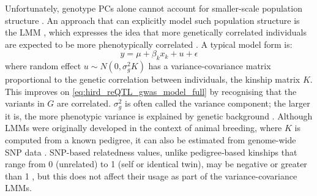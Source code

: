 Unfortunately, genotype \glspl{PC} alone cannot account for smaller-scale population structure \autocite{price2010NewApproachesPopulation}.
An approach that can explicitly model such population structure is the \gls{LMM} \autocite{price2010NewApproachesPopulation,eu-ahsunthornwattana2014ComparisonMethodsAccount,golan2018MixedModelsCaseControl},
which expresses the idea that more genetically correlated individuals are expected to be more phenotypically correlated \autocite{vilhjalmsson2013NatureConfoundingGenomewide}.
A typical model form is:
\begin{equation}
    y = \mu + \beta_k x_k + u + \epsilon
    \label{eq:hird_reQTL_gwas_model_lmm}
\end{equation}
where random effect $u \sim N(0, \sigma_g^2 K)$
has a variance-covariance matrix proportional to the genetic correlation between individuals, the kinship matrix $K$.
This improves on \cref{eq:hird_reQTL_gwas_model_full} by recognising that the variants in $G$ are correlated.
$\sigma_g^2$ is often called the variance component; the larger it is, the more phenotypic variance is explained by genetic background \autocite{golan2018MixedModelsCaseControl}.
Although \glspl{LMM} were originally developed in the context of animal breeding, where $K$ is computed from a known pedigree,
it can also be estimated from genome-wide \gls{SNP} data \autocite{eu-ahsunthornwattana2014ComparisonMethodsAccount,sul2018PopulationStructureGenetic}.
\gls{SNP}-based relatedness values, unlike pedigree‐based kinships that range from 0 (unrelated) to 1 (self or identical twin), may be negative or greater than 1 \autocite{wang2014MarkerbasedEstimatesRelatedness}, but this does not affect their usage as part of the variance-covariance \glspl{LMM}.
%
%
%
%

